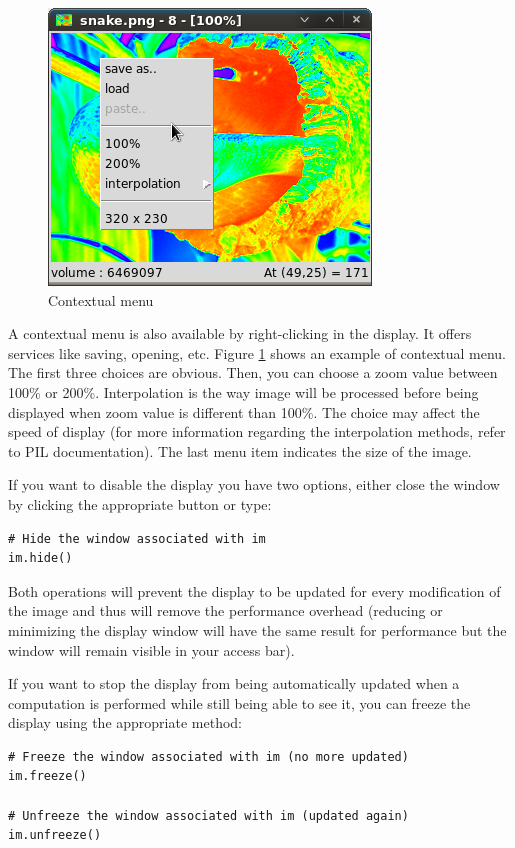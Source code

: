 \documentclass[a4paper,10pt,oneside]{article}
\begin{document}
\begin{figure}
\centering
\includegraphics[scale=0.5]{images/mamba_menu.png}
\caption{Contextual menu}
\label{fig:menu}
\end{figure}

A contextual menu is also available by right-clicking in the display. It offers
services like saving, opening, etc. Figure \ref{fig:menu} shows an example of 
contextual menu. The first three choices are obvious. Then, you can choose a zoom
value between 100\% or 200\%. Interpolation is the way image will be processed
before being displayed when zoom value is different than 100\%. The choice
may affect the speed of display (for more information regarding the interpolation
methods, refer to PIL documentation). The last menu item indicates the size of
the image.

If you want to disable the display you have two options, either close the window
by clicking the appropriate button or type:

\lstset{language=Python}
\begin{lstlisting}
# Hide the window associated with im
im.hide()
\end{lstlisting}

Both operations will prevent the display to be updated for every modification of
the image and thus will remove the performance overhead (reducing or minimizing 
the display window will have the same result for performance but the window will
remain visible in your access bar).

If you want to stop the display from being automatically updated when a 
computation is performed while still being able to see it, you can freeze the 
display using the appropriate method:

\lstset{language=Python}
\begin{lstlisting}
# Freeze the window associated with im (no more updated)
im.freeze()

# Unfreeze the window associated with im (updated again)
im.unfreeze()
\end{lstlisting}
\end{document}
